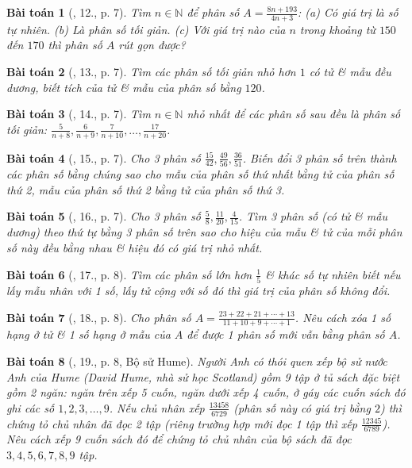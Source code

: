 \documentclass{article}
\newtheorem{baitoan}{Bài toán}
\begin{document}
\begin{baitoan}[\cite{Binh_Toan_6_tap_2}, 12., p. 7]
	Tìm $n\in\mathbb{N}$ để phân số $A = \frac{8n + 193}{4n + 3}$: (a) Có giá trị là số tự nhiên. (b) Là phân số tối giản. (c) Với giá trị nào của $n$ trong khoảng từ $150$ đến $170$ thì phân số $A$ rút gọn được?
\end{baitoan}

\begin{baitoan}[\cite{Binh_Toan_6_tap_2}, 13., p. 7]
	Tìm các phân số tối giản nhỏ hơn $1$ có tử \& mẫu đều dương, biết tích của tử \& mẫu của phân số bằng $120$.
\end{baitoan}

\begin{baitoan}[\cite{Binh_Toan_6_tap_2}, 14., p. 7]
	Tìm $n\in\mathbb{N}$ nhỏ nhất để các phân số sau đều là phân số tối giản: $\frac{5}{n + 8},\frac{6}{n + 9},\frac{7}{n + 10},\ldots,\frac{17}{n + 20}$.
\end{baitoan}

\begin{baitoan}[\cite{Binh_Toan_6_tap_2}, 15., p. 7]
	Cho 3 phân số $\frac{15}{42},\frac{49}{56},\frac{36}{51}$. Biến đổi 3 phân số trên thành các phân số bằng chúng sao cho mẫu của phân số thứ nhất bằng tử của phân số thứ 2, mẫu của phân số thứ 2 bằng tử của phân số thứ 3.
\end{baitoan}

\begin{baitoan}[\cite{Binh_Toan_6_tap_2}, 16., p. 7]
	Cho 3 phân số $\frac{5}{8},\frac{11}{20},\frac{4}{15}$. Tìm 3 phân số (có tử \& mẫu dương) theo thứ tự bằng 3 phân số trên sao cho hiệu của mẫu \& tử của mỗi phân số này đều bằng nhau \& hiệu đó có giá trị nhỏ nhất.
\end{baitoan}

\begin{baitoan}[\cite{Binh_Toan_6_tap_2}, 17., p. 8]
	Tìm các phân số lớn hơn $\frac{1}{5}$ \& khác số tự nhiên biết nếu lấy mẫu nhân với 1 số, lấy tử cộng với số đó thì giá trị của phân số không đổi.
\end{baitoan}

\begin{baitoan}[\cite{Binh_Toan_6_tap_2}, 18., p. 8]
	Cho phân số $A = \frac{23 + 22 + 21 + \cdots + 13}{11 + 10 + 9 + \cdots + 1}$. Nêu cách xóa 1 số hạng ở tử \& 1 số hạng ở mẫu của $A$ để được 1 phân số mới vẫn bằng phân số $A$.
\end{baitoan}

\begin{baitoan}[\cite{Binh_Toan_6_tap_2}, 19., p. 8, Bộ sử Hume]
	Người Anh có thói quen xếp bộ sử nước Anh của Hume (David Hume, nhà sử học Scotland) gồm 9 tập ở tủ sách đặc biệt gồm 2 ngăn: ngăn trên xếp 5 cuốn, ngăn dưới xếp 4 cuốn, ở gáy các cuốn sách đó ghi các số $1,2,3,\ldots,9$. Nếu chủ nhân xếp $\frac{13458}{6729}$ (phân số này có giá trị bằng $2$) thì chứng tỏ chủ nhân đã đọc 2 tập (riêng trường hợp mới đọc 1 tập thì xếp $\frac{12345}{6789}$). Nêu cách xếp 9 cuốn sách đó để chứng tỏ chủ nhân của bộ sách đã đọc $3,4,5,6,7,8,9$ tập.
\end{baitoan}
\end{document}
